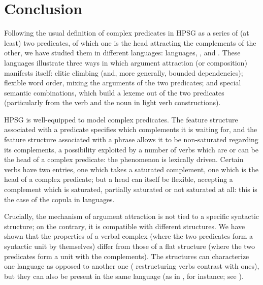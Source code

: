 \section{Conclusion}\label{GSsection6}

Following the usual definition of complex predicates in HPSG as a series of (at least) two predicates, of which one is the head attracting the complements of the other, we have studied them in different languages:  languages, ,  and . These languages illustrate three ways in which argument attraction (or composition) manifests itself: clitic climbing (and, more generally, bounded dependencies); flexible word order, mixing the arguments of the two predicates; and special semantic combinations, which build a lexeme out of the two predicates (particularly from the verb and the noun in light verb constructions). 

HPSG is well-equipped to model complex predicates. The feature structure associated with a predicate specifies which complements it is waiting for, and the feature structure associated with a phrase allows it to be non-saturated regarding its complements, a possibility exploited by a number of verbs which are or can be the head of a complex predicate: the phenomenon is lexically driven. Certain verbs have two entries, one which takes a saturated complement, one which is the head of a complex predicate; but a head can itself be flexible, accepting a complement which is saturated, partially saturated or not saturated at all: this is the case of the copula in  languages.

Crucially, the mechanism of argument attraction is not tied to a specific syntactic structure; on
the contrary, it is compatible with different structures. We have shown that the properties of a
verbal complex (where the two predicates form a syntactic unit by themselves) differ from those of a
flat structure (where the two predicates form a unit with the complements). The structures can
characterize one language as opposed to another one ( restructuring verbs contrast with 
ones), but they can also be present in the same language (as in , for instance; see \citealt{Monachesi99b-u}). 


